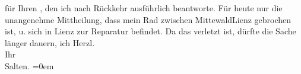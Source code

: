 \begin{ledgroupsized}[t]{13cm}
               für Ihren \label{K_L03125-1v}\label{K_L03125-1h}, den ich nach Rückkehr ausführlich beantworte. Für heute nur die unangenehme Mittheilung, dass mein Rad zwischen MittewaldLienz gebrochen ist, u. sich in Lienz zur Reparatur befindet. Da das \label{K_L03125-2v}\label{K_L03125-2h} verletzt ist, dürfte die Sache länger dauern, ich \label{K_L03125-3v}\label{K_L03125-3h}\pend
           \pstart
           Herzl.{\\[\baselineskip]} Ihr{\\[\baselineskip]}\spacefill\mbox{Salten.}\pend
           \leftskip=0em{}
         
         \endnumbering{}\end{ledgroupsized}  \newcommand{\dateiname}{L03125}\newcommand{\titel}{Felix Salten an Arthur Schnitzler, 17. 8. 1893}\newcommand{\editorInnen}{Martin Anton Müller und Laura Untner}
      